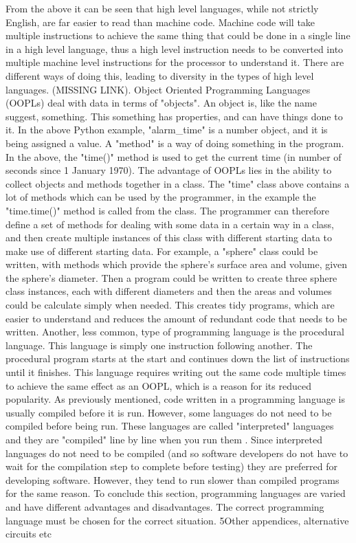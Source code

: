 \documentclass[a4]{report}
\begin{document}
	From the above it can be seen that high level languages, while not strictly English, are far easier to read than machine code. Machine code will take multiple instructions to achieve the same thing that could be done in a single line in a high level language, thus a high level instruction needs to be converted into multiple machine level instructions for the processor to understand it. There are different ways of doing this, leading to diversity in the types of high level languages. (MISSING LINK). Object Oriented Programming Languages (OOPLs) deal with data in terms of "objects"\cite{proglangwhatisoopl}. An object is, like the name suggest, something. This something has properties, and can have things done to it. In the above Python example, "alarm\_time" is a number object, and it is being assigned a value. A "method" is a way of doing something in the program. In the above, the "time()" method is used to get the current time (in number of seconds since 1 January 1970). The advantage of OOPLs lies in the ability to collect objects and methods together in a class. The "time" class above contains a lot of methods which can be used by the programmer, in the example the "time.time()" method is called from the class. The programmer can therefore define a set of methods for dealing with some data in a certain way in a class, and then create multiple instances of this class with different starting data to make use of different starting data. For example, a "sphere" class could be written, with methods which provide the sphere's surface area and volume, given the sphere's diameter. Then a program could be written to create three sphere class instances, each with different diameters and then the areas and volumes could be calculate simply when needed. This creates tidy programs, which are easier to understand and reduces the amount of redundant code that needs to be written.\newline \newline  \noindent
	Another, less common, type of programming language is the procedural language. This language is simply one instruction following another\cite{proglangwhatisoopl}. The procedural program starts at the start and continues down the list of instructions until it finishes. This language requires writing out the same code multiple times to achieve the same effect as an OOPL, which is a reason for its reduced popularity.\newline \newline  \noindent
	As previously mentioned, code written in a programming language is usually compiled before it is run. However, some languages do not need to be compiled before being run. These languages are called "interpreted" languages and they are "compiled" line by line when you run them \cite{proglanginterp}. Since interpreted languages do not need to be compiled (and so software developers do not have to wait for the compilation step to complete before testing) they are preferred for developing software. However, they tend to run slower than compiled programs for the same reason.\newline \newline  \noindent
	To conclude this section,  programming languages are varied and have different advantages and disadvantages. The correct programming language must be chosen for the correct situation.\newline \newline  \noindent
5Other appendices, alternative circuits etc
\end{document}
